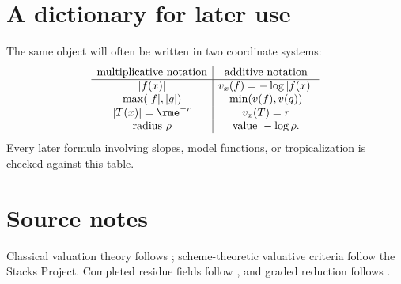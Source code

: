 \section{A dictionary for later use}

The same object will often be written in two coordinate systems:
\[
\begin{array}{c|c}
\text{multiplicative notation}&\text{additive notation}\\ \hline
|f(x)|&v_x(f)=-\log|f(x)|\\
\max(|f|,|g|)&\min(v(f),v(g))\\
|T(x)|=\rme^{-r}&v_x(T)=r\\
\text{radius }\rho&\text{value }-\log\rho.
\end{array}
\]
Every later formula involving slopes, model functions, or tropicalization is
checked against this table.

\section*{Source notes}

Classical valuation theory follows \cite{ZariskiSamuelII}; scheme-theoretic
valuative criteria follow the Stacks Project. Completed residue fields follow
\cite[Chapter~1]{Berk12}, and graded reduction follows
\cite[\S1]{Temkin2004}.
